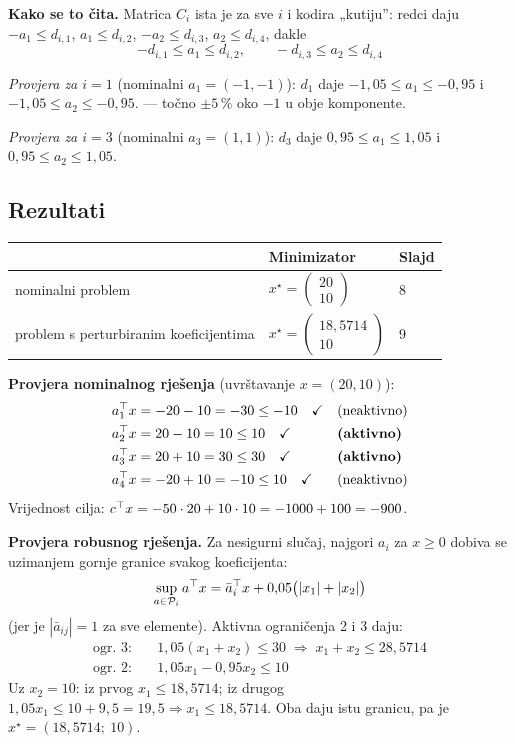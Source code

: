 \textbf{Kako se to čita.} Matrica $C_i$ ista je za sve $i$ i kodira „kutiju”:
redci daju $-a_1 \le d_{i,1}$, $a_1 \le d_{i,2}$, $-a_2 \le d_{i,3}$,
$a_2 \le d_{i,4}$, dakle
\[
-d_{i,1} \le a_1 \le d_{i,2}, \qquad -d_{i,3} \le a_2 \le d_{i,4}
\]

\emph{Provjera za $i = 1$} (nominalni $a_1 = (-1,-1)$): $d_1$ daje
$-1{,}05 \le a_1 \le -0{,}95$ i $-1{,}05 \le a_2 \le -0{,}95$. \checkmark ---
točno $\pm5\,\%$ oko $-1$ u obje komponente.

\emph{Provjera za $i = 3$} (nominalni $a_3 = (1,1)$): $d_3$ daje
$0{,}95 \le a_1 \le 1{,}05$ i $0{,}95 \le a_2 \le 1{,}05$. \checkmark

\subsection{Rezultati}

\begin{center}
\begin{tabular}{lll}
\toprule
& \textbf{Minimizator} & \textbf{Slajd} \\
\midrule
nominalni problem & $x^\star = \begin{pmatrix}20 \\ 10\end{pmatrix}$ & 8 \\[6pt]
problem s perturbiranim koeficijentima
  & $x^\star = \begin{pmatrix}18{,}5714 \\ 10\end{pmatrix}$ & 9 \\
\bottomrule
\end{tabular}
\end{center}

\textbf{Provjera nominalnog rješenja} (uvrštavanje $x = (20,10)$):
\begin{align}
a_1^{\top} x &= -20 - 10 = -30 \le -10 \quad\checkmark && \text{(neaktivno)} \\
a_2^{\top} x &= 20 - 10 = 10 \le 10 \quad\checkmark && \textbf{(aktivno)} \\
a_3^{\top} x &= 20 + 10 = 30 \le 30 \quad\checkmark && \textbf{(aktivno)} \\
a_4^{\top} x &= -20 + 10 = -10 \le 10 \quad\checkmark && \text{(neaktivno)}
\end{align}
Vrijednost cilja: $c^{\top} x = -50\cdot20 + 10\cdot10 = -1000 + 100 = -900$.

\textbf{Provjera robusnog rješenja.} Za nesigurni slučaj, najgori $a_i$ za
$x \ge 0$ dobiva se uzimanjem gornje granice svakog koeficijenta:
\[
\sup_{a\in\mathcal{P}_i} a^{\top} x
= \bar a_i^{\top} x + 0{,}05\big(|x_1| + |x_2|\big)
\]
(jer je $|\bar a_{ij}| = 1$ za sve elemente). Aktivna ograničenja 2 i 3 daju:
\begin{align}
\text{ogr. 3:}\quad & 1{,}05(x_1 + x_2) \le 30
  \;\Rightarrow\; x_1 + x_2 \le 28{,}5714 \\
\text{ogr. 2:}\quad & 1{,}05x_1 - 0{,}95x_2 \le 10
\end{align}
Uz $x_2 = 10$: iz prvog $x_1 \le 18{,}5714$; iz drugog
$1{,}05x_1 \le 10 + 9{,}5 = 19{,}5 \Rightarrow x_1 \le 18{,}5714$. Oba daju
istu granicu, pa je $x^\star = (18{,}5714;\ 10)$. \checkmark

